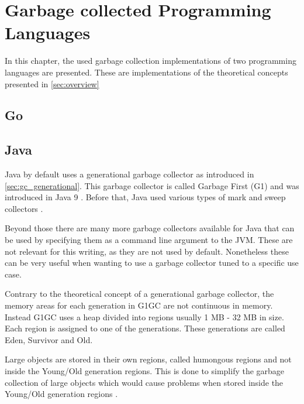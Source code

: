 \chapter{Garbage collected Programming Languages}

In this chapter, the used garbage collection implementations of two programming
languages are presented. These are implementations of the theoretical concepts
presented in \autoref{sec:overview}

\section{Go}
\section{Java}

Java by default uses a generational garbage collector as introduced in \autoref{sec:gc_generational}.
This garbage collector is called Garbage First (G1) and was introduced in Java 9 \cite{java_gc_comparison_2018}.
Before that, Java used various types of mark and sweep collectors \cite{java_available_gcs}.

Beyond those there are many more garbage collectors available for Java that can
be used by specifying them as a command line argument to the JVM.
These are not relevant for this writing, as they are not used by default.
Nonetheless these can be very useful when wanting to use a garbage collector
tuned to a specific use case.

Contrary to the theoretical concept of a generational garbage collector,
the memory areas for each generation in G1GC are not continuous in memory.
Instead G1GC uses a heap divided into regions usually 1 MB - 32 MB in size.
Each region is assigned to one of the generations.
These generations are called Eden, Survivor and Old. \cite{java_g1_getting_started}

Large objects are stored in their own regions, called humongous regions
and not inside the Young/Old generation regions.
This is done to simplify the garbage collection of large objects which
would cause problems when stored inside the Young/Old generation regions \cite[2.1 Heap Layout]{java_g1_2004}.


